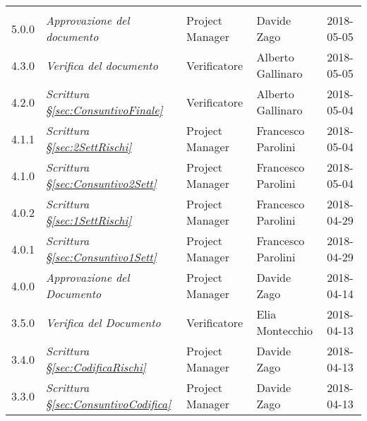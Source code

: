 \newpage 
\section*{}
	\begin{longtable}[H]{C{2cm}|C{4cm}|C{3cm}|C{3cm}|R{2cm}}
		
		 & & & &  \\
		
		
		5.0.0 &\emph{Approvazione del documento} & Project Manager & Davide Zago & 2018-05-05 \\
		\hline
		
		4.3.0 &\emph{Verifica del documento} & Verificatore & Alberto Gallinaro & 2018-05-05 \\
		\hline
		
		4.2.0 &\emph{Scrittura §\ref{sec:ConsuntivoFinale}} & Verificatore & Alberto Gallinaro & 2018-05-04 \\
		\hline
		
		4.1.1 &\emph{Scrittura  §\ref{sec:2SettRischi}} & Project Manager & Francesco Parolini & 2018-05-04 \\
		\hline
		
		4.1.0 &\emph{Scrittura  §\ref{sec:Consuntivo2Sett}} & Project Manager & Francesco Parolini & 2018-05-04 \\
		\hline
		
		4.0.2 &\emph{Scrittura §\ref{sec:1SettRischi}} & Project Manager & Francesco Parolini & 2018-04-29 \\
		\hline
			
		4.0.1 &\emph{Scrittura §\ref{sec:Consuntivo1Sett}} & Project Manager & Francesco Parolini & 2018-04-29 \\
		\hline
		
		4.0.0 &\emph{Approvazione del Documento} & Project Manager & Davide Zago & 2018-04-14 \\
		\hline
		
		3.5.0 &\emph{Verifica del Documento} & Verificatore & Elia Montecchio & 2018-04-13 \\
		\hline
		
		3.4.0 &\emph{Scrittura §\ref{sec:CodificaRischi}} & Project Manager &  Davide Zago & 2018-04-13 \\
		\hline
		
		3.3.0 &\emph{Scrittura §\ref{sec:ConsuntivoCodifica}} & Project Manager &  Davide Zago & 2018-04-13 \\
		\hline


\end{longtable}
